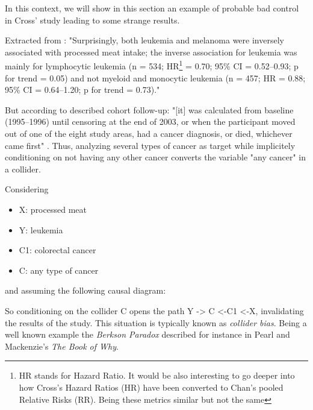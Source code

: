 \documentclass{article}
\begin{document}
In this context, we will show in this section an example of probable bad control in Cross' study leading to some strange results.

Extracted from \cite{cross}: "Surprisingly, both leukemia and melanoma were inversely associated with processed meat intake; the inverse association for leukemia was mainly for lymphocytic leukemia (n = 534; HR\footnote{HR stands for Hazard Ratio.
It would be also interesting to go deeper into how Cross's Hazard Ratios (HR) have been converted to Chan's pooled Relative Risks (RR). Being these metrics similar but not the same} = 0.70; 95\% CI = 0.52–0.93; p for trend = 0.05) and not myeloid and monocytic leukemia (n = 457; HR = 0.88; 95\% CI = 0.64–1.20; p for trend = 0.73)."

But according to described cohort follow-up: "[it] was calculated from baseline (1995–1996) until censoring at the end of 2003, or when the participant moved out of one of the eight study areas, had a cancer diagnosis, or died, whichever came first" \cite{cross}. Thus, analyzing several types of cancer as target while implicitely conditioning on not having any other cancer converts the variable "any cancer" in a collider.

Considering
\begin{itemize}
\item X: processed meat
\item Y: leukemia
\item C1: colorectal cancer
\item C: any type of cancer
\end{itemize}

and assuming the following causal diagram:


So conditioning on the collider C opens the path Y -> C <-C1 <-X, invalidating the results of the study. This situation is typically known as \textit{collider bias}. Being a well known example the \textit{Berkson Paradox} described for instance in Pearl and Mackenzie's \textit{The Book of Why}.\cite{bookofwhy}
\end{document}
